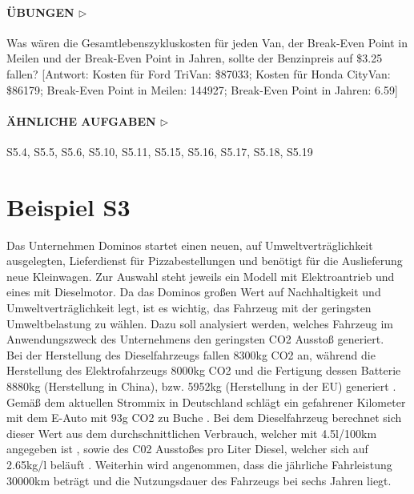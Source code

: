 \documentclass[13pt,titlepage]{article}
\begin{document}
\paragraph{\textbf{ÜBUNGEN} $\triangleright$ }
Was w\"aren die Gesamtlebenszykluskosten f\"ur jeden Van, der Break-Even Point in Meilen und der Break-Even Point in Jahren, sollte der Benzinpreis auf \$3.25 fallen? [Antwort: Kosten für Ford TriVan: \$87033; Kosten f\"ur Honda CityVan: \$86179; Break-Even Point in Meilen: 144927; Break-Even Point in Jahren: 6.59]

\paragraph{\textbf{ÄHNLICHE AUFGABEN} $\triangleright$ }
S5.4, S5.5, S5.6, S5.10, S5.11, S5.15, S5.16, S5.17, S5.18, S5.19


\section*{Beispiel S3}

Das Unternehmen Dominos startet einen neuen, auf Umweltverträglichkeit ausgelegten, Lieferdienst für Pizzabestellungen und benötigt für die Auslieferung neue Kleinwagen. Zur Auswahl steht jeweils ein Modell mit Elektroantrieb und eines mit Dieselmotor. Da das Dominos großen Wert auf Nachhaltigkeit und Umweltverträglichkeit legt, ist es wichtig, das Fahrzeug mit der geringsten Umweltbelastung zu wählen. Dazu soll analysiert werden, welches Fahrzeug im Anwendungszweck des Unternehmens den geringsten CO2 Ausstoß generiert.\\ Bei der Herstellung des Dieselfahrzeugs fallen 8300kg CO2 an, während die Herstellung des Elektrofahrzeugs 8000kg CO2 und die Fertigung dessen Batterie 8880kg (Herstellung in China), bzw. 5952kg (Herstellung in der EU) generiert \cite{vdi}. Gemäß dem aktuellen Strommix in Deutschland schlägt ein gefahrener Kilometer mit dem E-Auto mit 93g CO2 zu Buche \cite{vdi}. Bei dem Dieselfahrzeug berechnet sich dieser Wert aus dem durchschnittlichen Verbrauch, welcher mit 4.5l/100km angegeben ist \cite{vdi}, sowie des C02 Ausstoßes pro Liter Diesel, welcher sich auf 2.65kg/l beläuft \cite{diesel}. Weiterhin wird angenommen, dass die jährliche Fahrleistung 30000km beträgt und die Nutzungsdauer des Fahrzeugs bei sechs Jahren \cite{finanzministerium} liegt.  
\end{document}
